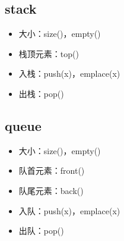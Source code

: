 \documentclass[letterpaper,10pt,english]{sphinxmanual}
\begin{document}
\subsection{stack}
\label{\detokenize{cpp/19_stl:stack}}
%
\begin{sphinxVerbatim}[commandchars=\\\{\}]
\end{sphinxVerbatim}
\begin{itemize}
\item {} 
大小：size()，empty()

\item {} 
栈顶元素：top()

\item {} 
入栈：push(x)，emplace(x)

\item {} 
出栈：pop()

%
\begin{sphinxVerbatim}[commandchars=\\\{\}]
 
\end{sphinxVerbatim}

\end{itemize}


\subsection{queue}
\label{\detokenize{cpp/19_stl:queue}}
%
\begin{sphinxVerbatim}[commandchars=\\\{\}]
\end{sphinxVerbatim}
\begin{itemize}
\item {} 
大小：size()，empty()

\item {} 
队首元素：front()

\item {} 
队尾元素：back()

\item {} 
入队：push(x)，emplace(x)

\item {} 
出队：pop()

%
\begin{sphinxVerbatim}[commandchars=\\\{\}]
 
\end{sphinxVerbatim}

\end{itemize}
\end{document}
